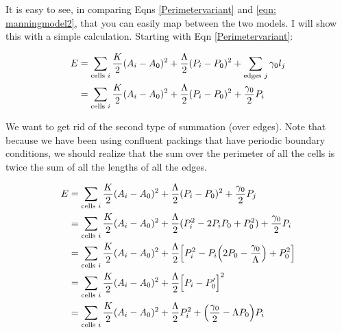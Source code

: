 \documentclass[12pt,a4paper]{article}
\begin{document}
It is easy to see, in comparing Eqns \ref{Perimetervariant} and \ref{eqn: manningmodel2}, that you can easily map between the two models. I will show this with a simple calculation. Starting with Eqn \ref{Perimetervariant}:
\begin{center}
\begin{equation}
\begin{split}
E &=  \sum_{\text{cells} \hspace{1mm} i} \frac{K}{2} (A_i - A_0)^2 + \frac{\Lambda}{2} (P_i - P_0)^2 + \sum_{\text{edges} \hspace{1mm} j} \gamma_0 l_j\\
&=\sum_{\text{cells} \hspace{1mm} i} \frac{K}{2} (A_i - A_0)^2 + \frac{\Lambda}{2} (P_i - P_0)^2 + \frac{\gamma_0}{2} P_i\\
\end{split}
\end{equation}
\end{center}
We want to get rid of the second type of summation (over edges). Note that because we have been using confluent packings that have periodic boundary conditions, we should realize that the sum over the perimeter of all the cells is twice the sum of all the lengths of all the edges. 
\begin{center}
\begin{equation}
\begin{split}
E &= \sum_{\text{cells} \hspace{1mm} i} \frac{K}{2} (A_i - A_0)^2 + \frac{\Lambda}{2} (P_i - P_0)^2 + \frac{\gamma_0}{2} P_j\\
&= \sum_{\text{cells} \hspace{1mm} i} \frac{K}{2} (A_i - A_0)^2 +  \frac{\Lambda}{2} ( P_i^2 - 2P_i P_0 + P_0^2) + \frac{\gamma_0}{2} P_i \\
&= \sum_{\text{cells} \hspace{1mm} i} \frac{K}{2} (A_i - A_0)^2 +  \frac{\Lambda}{2} \Big[ P_i^2 - P_i \Big(2 P_0 - \frac{\gamma_0}{\Lambda} \Big) + P_0^2 \Big]  \\
& = \sum_{\text{cells} \hspace{1mm} i} \frac{K}{2} (A_i - A_0)^2 +  \frac{\Lambda}{2} \Big[ P_i - P_0' \Big]^2  \\
& = \sum_{\text{cells} \hspace{1mm} i} \frac{K}{2} (A_i - A_0)^2 +  \frac{\Lambda}{2} P_i ^2 + \Big(\frac{\gamma_0}{2} - \Lambda P_0\Big)P_i \\
\end{split}
\end{equation}
\end{center}
\end{document}
